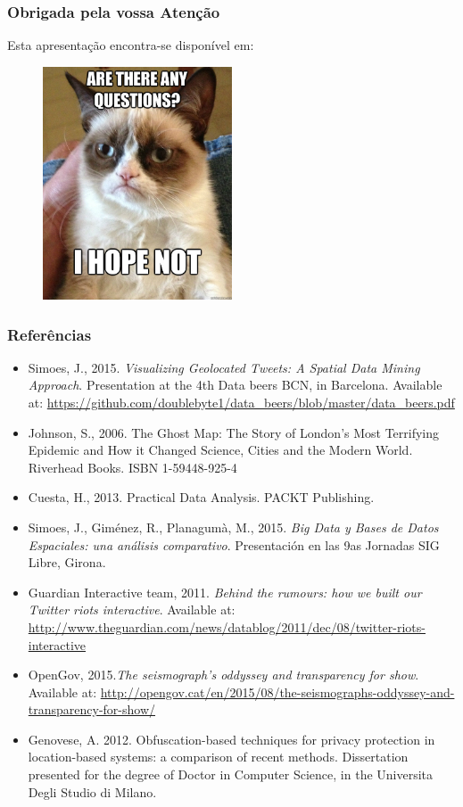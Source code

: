 \documentclass[hyperref={pdfpagelabels=true}]{beamer}
\begin{document}
\begin{frame}
\frametitle{Obrigada pela vossa Aten\c{c}\~{a}o}
    Esta apresenta\c{c}\~{a}o encontra-se dispon\'{i}vel em: 
    \begin{figure}   
      \includegraphics[width=0.5\textwidth]{cat.jpg}      
    \end{figure}   
    
\end{frame}

\begin{frame}
\frametitle{Refer\^{e}ncias}
\tiny{
    \begin{itemize}
    \item Simoes, J., 2015. \textit{Visualizing Geolocated Tweets: A Spatial Data Mining Approach}. Presentation at the 4th Data beers BCN, in Barcelona. Available at: \url{https://github.com/doublebyte1/data_beers/blob/master/data_beers.pdf}
    \item Johnson, S., 2006. The Ghost Map: The Story of London's Most Terrifying Epidemic \textemdash and How it Changed Science, Cities and the Modern World. Riverhead Books. ISBN 1-59448-925-4
    \item Cuesta, H., 2013. Practical Data Analysis. PACKT Publishing. 
    \item Simoes, J., Gim\'{e}nez, R., Planagum\`{a}, M., 2015. \textit{Big Data y Bases de Datos Espaciales: una an\'{a}lisis comparativo}. Presentaci\'{on} en las 9as Jornadas SIG Libre, Girona.
    \item Guardian Interactive team, 2011. \textit{Behind the rumours: how we built our Twitter riots interactive}. Available at: \url{http://www.theguardian.com/news/datablog/2011/dec/08/twitter-riots-interactive}
    \item OpenGov, 2015.\textit{The seismograph's oddyssey and transparency for show}. Available at: \url{http://opengov.cat/en/2015/08/the-seismographs-oddyssey-and-transparency-for-show/}
    \item Genovese, A. 2012. Obfuscation-based techniques for privacy protection in location-based systems: a comparison of recent methods. Dissertation presented for the degree of Doctor in Computer Science, in the Universita Degli Studio di Milano.
    \end{itemize}
}
\end{frame}
\end{document}
